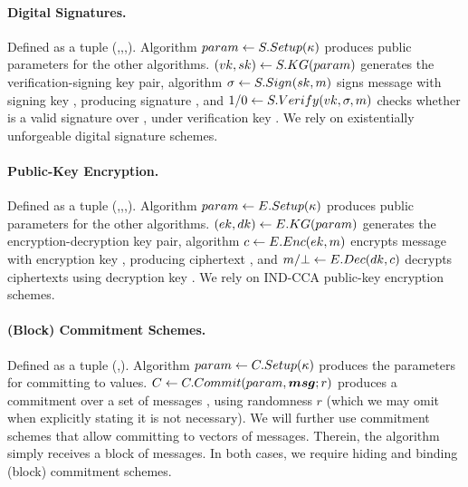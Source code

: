 \paragraph{Digital Signatures.} %
Defined as a tuple (\SSetup,\SKeyGen,\SSign,\SVerify). Algorithm $param \gets
S.Setup(\kappa)$ produces public parameters for the other algorithms.
$(vk,sk) \gets S.KG(param)$ generates the verification-signing key
pair, algorithm $\sigma \gets S.Sign(sk,m)$ signs message \msg with
signing key \Ssk, producing signature \Ssig, and $1/0 \gets S.Verify(vk,
\sigma,m)$ checks whether \Ssig is a valid signature over \msg, under
verification key \Svk. We rely on existentially unforgeable digital signature
schemes.

\paragraph{Public-Key Encryption.} %
Defined as a tuple (\ESetup,\EKeyGen,\EEnc,\EDec). Algorithm $param \gets
E.Setup(\kappa)$ produces public parameters for the other algorithms.
$(ek,dk) \gets E.KG(param)$ generates the encryption-decryption key
pair, algorithm $c \gets E.Enc(ek,m)$ encrypts message \msg with
encryption key \Eek, producing ciphertext \Ec, and $m/\bot \gets E.Dec(dk,
c)$ decrypts ciphertexts using decryption key \Edk. We rely on IND-CCA
public-key encryption schemes.

\paragraph{(Block) Commitment Schemes.} %
Defined as a tuple (\CSetup,\CCommit). Algorithm $param \gets
C.Setup(\kappa)$ produces the parameters for committing to values. $C
\gets C.Commit(param, \boldsymbol{msg}; r)$ produces a commitment \Ccom over a set of
messages \smsg, using randomness $r$ (which we may omit when explicitly
stating it is not necessary). We will further use commitment schemes that
allow committing to vectors of messages. Therein, the \CCommit algorithm simply
receives a block of messages. In both cases, we require hiding and binding
(block) commitment schemes.

